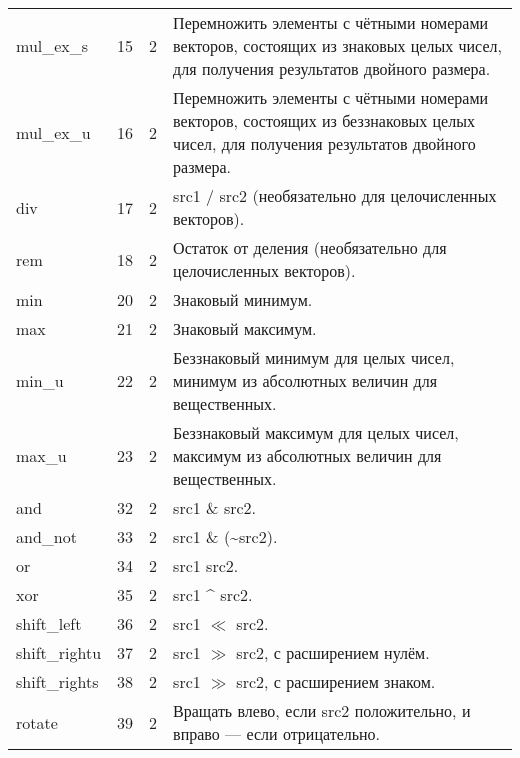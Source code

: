 \documentclass[forwardcom.tex]{subfiles}
\begin{document}
\begin{longtable} {|p{18mm}|p{9mm}|p{21mm}|p{95mm}|}
mul\_ex\_s        & 15           & 2                                & Перемножить элементы с чётными номерами векторов, состоящих из знаковых целых чисел, для получения результатов двойного размера. \\
mul\_ex\_u        & 16           & 2                                & Перемножить элементы с чётными номерами векторов, состоящих из беззнаковых целых чисел, для получения результатов двойного размера. \\
div               & 17           & 2                                & src1 / src2 (необязательно для целочисленных векторов). \\
rem               & 18           & 2                                & Остаток от деления (необязательно для целочисленных векторов). \\
min               & 20           & 2                                & Знаковый минимум. \\
max               & 21           & 2                                & Знаковый максимум. \\
min\_u            & 22           & 2                                & Беззнаковый минимум для целых чисел, минимум из абсолютных величин для вещественных. \\
max\_u            & 23           & 2                                & Беззнаковый максимум для целых чисел, максимум из абсолютных величин для вещественных. \\
and               & 32           & 2                                & src1 \& src2. \\
and\_not          & 33           & 2                                & src1 \& (\~{}src2). \\
or                & 34           & 2                                & src1 \textbar{} src2. \\
xor               & 35           & 2                                & src1 \^{} src2. \\
shift\_left       & 36           & 2                                & src1 $\ll$  src2.  \\
shift\_rightu     & 37           & 2                                & src1 $\gg$ src2, с расширением нулём. \\
shift\_rights     & 38           & 2                                & src1 $\gg$ src2, с расширением знаком. \\
rotate            & 39           & 2                                & Вращать влево, если src2 положительно, и вправо --- если отрицательно. \\

\end{longtable}
\end{document}
